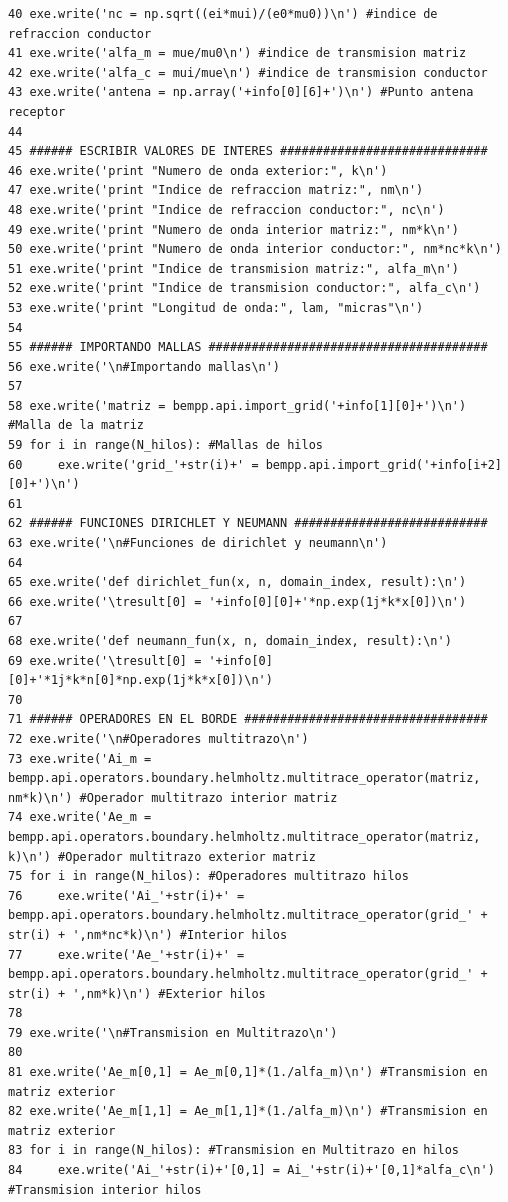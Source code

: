 \documentclass[12pt,letterpaper]{article}
\numberwithin{equation}{section}
\begin{document}
\begin{lstlisting}
40 exe.write('nc = np.sqrt((ei*mui)/(e0*mu0))\n') #indice de refraccion conductor
41 exe.write('alfa_m = mue/mu0\n') #indice de transmision matriz
42 exe.write('alfa_c = mui/mue\n') #indice de transmision conductor
43 exe.write('antena = np.array('+info[0][6]+')\n') #Punto antena receptor
44 
45 ###### ESCRIBIR VALORES DE INTERES #############################
46 exe.write('print "Numero de onda exterior:", k\n')
47 exe.write('print "Indice de refraccion matriz:", nm\n')
48 exe.write('print "Indice de refraccion conductor:", nc\n')
49 exe.write('print "Numero de onda interior matriz:", nm*k\n')
50 exe.write('print "Numero de onda interior conductor:", nm*nc*k\n')
51 exe.write('print "Indice de transmision matriz:", alfa_m\n')
52 exe.write('print "Indice de transmision conductor:", alfa_c\n')
53 exe.write('print "Longitud de onda:", lam, "micras"\n')
54 
55 ###### IMPORTANDO MALLAS #######################################
56 exe.write('\n#Importando mallas\n')
57 
58 exe.write('matriz = bempp.api.import_grid('+info[1][0]+')\n') #Malla de la matriz
59 for i in range(N_hilos): #Mallas de hilos
60     exe.write('grid_'+str(i)+' = bempp.api.import_grid('+info[i+2][0]+')\n')
61 
62 ###### FUNCIONES DIRICHLET Y NEUMANN ###########################
63 exe.write('\n#Funciones de dirichlet y neumann\n')
64 
65 exe.write('def dirichlet_fun(x, n, domain_index, result):\n')
66 exe.write('\tresult[0] = '+info[0][0]+'*np.exp(1j*k*x[0])\n')
67 
68 exe.write('def neumann_fun(x, n, domain_index, result):\n')
69 exe.write('\tresult[0] = '+info[0][0]+'*1j*k*n[0]*np.exp(1j*k*x[0])\n')
70 
71 ###### OPERADORES EN EL BORDE ##################################
72 exe.write('\n#Operadores multitrazo\n')
73 exe.write('Ai_m = bempp.api.operators.boundary.helmholtz.multitrace_operator(matriz, nm*k)\n') #Operador multitrazo interior matriz
74 exe.write('Ae_m = bempp.api.operators.boundary.helmholtz.multitrace_operator(matriz, k)\n') #Operador multitrazo exterior matriz
75 for i in range(N_hilos): #Operadores multitrazo hilos
76     exe.write('Ai_'+str(i)+' = bempp.api.operators.boundary.helmholtz.multitrace_operator(grid_' + str(i) + ',nm*nc*k)\n') #Interior hilos
77     exe.write('Ae_'+str(i)+' = bempp.api.operators.boundary.helmholtz.multitrace_operator(grid_' + str(i) + ',nm*k)\n') #Exterior hilos
78 
79 exe.write('\n#Transmision en Multitrazo\n')
80 
81 exe.write('Ae_m[0,1] = Ae_m[0,1]*(1./alfa_m)\n') #Transmision en matriz exterior
82 exe.write('Ae_m[1,1] = Ae_m[1,1]*(1./alfa_m)\n') #Transmision en matriz exterior
83 for i in range(N_hilos): #Transmision en Multitrazo en hilos
84     exe.write('Ai_'+str(i)+'[0,1] = Ai_'+str(i)+'[0,1]*alfa_c\n') #Transmision interior hilos

\end{lstlisting}
\end{document}
